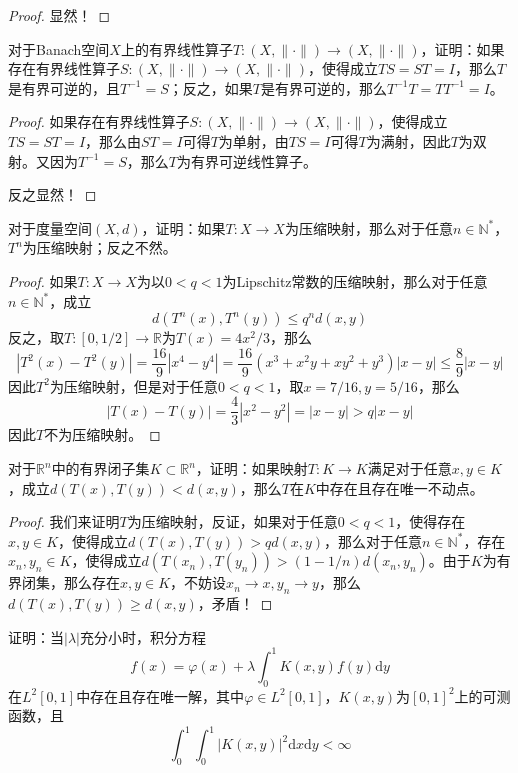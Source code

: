 \documentclass[lang = cn, scheme = chinese, 10pt]{elegantbook}
\newcommand{\N}{\mathbb{N}}  %
\newcommand{\R}{\mathbb{R}}  %
\newcommand{\sub}{\subset}   %
\begin{document}
\begin{proof}
	显然！
\end{proof}

\begin{proposition}
	对于Banach空间$X$上的有界线性算子$T:(X,\|\cdot\|)\to (X,\|\cdot\|)$，证明：如果存在有界线性算子$S:(X,\|\cdot\|)\to (X,\|\cdot\|)$，使得成立$TS=ST=I$，那么$T$是有界可逆的，且$T^{-1}=S$；反之，如果$T$是有界可逆的，那么$T^{-1}T=TT^{-1}=I$。
\end{proposition}

\begin{proof}
	如果存在有界线性算子$S:(X,\|\cdot\|)\to (X,\|\cdot\|)$，使得成立$TS=ST=I$，那么由$ST=I$可得$T$为单射，由$TS=I$可得$T$为满射，因此$T$为双射。又因为$T^{-1}=S$，那么$T$为有界可逆线性算子。
	
	反之显然！
\end{proof}

\begin{proposition}
	对于度量空间$(X,d)$，证明：如果$T:X\to X$为压缩映射，那么对于任意$n\in\N^*$，$T^n$为压缩映射；反之不然。
	
\end{proposition}

\begin{proof}
	如果$T:X\to X$为以$0<q<1$为Lipschitz常数的压缩映射，那么对于任意$n\in\N^*$，成立
	$$
	d(T^n(x),T^n(y))\le q^nd(x,y)
	$$
	反之，取$T:[0,1/2]\to\R$为$T(x)=4x^2/3$，那么
	$$
	|T^2(x)-T^2(y)|=\frac{16}{9}|x^4-y^4|=\frac{16}{9}(x^3+x^2y+xy^2+y^3)|x-y|\le \frac{8}{9}|x-y|
	$$
	因此$T^2$为压缩映射，但是对于任意$0<q<1$，取$x=7/16,y=5/16$，那么
	$$
	|T(x)-T(y)|=\frac{4}{3}|x^2-y^2|=|x-y|>q|x-y|
	$$
	因此$T$不为压缩映射。
\end{proof}

\begin{proposition}
	对于$\R^n$中的有界闭子集$K\sub \R^n$，证明：如果映射$T:K\to K$满足对于任意$x,y\in K$，成立$d(T(x),T(y))<d(x,y)$，那么$T$在$K$中存在且存在唯一不动点。
\end{proposition}

\begin{proof}
	我们来证明$T$为压缩映射，反证，如果对于任意$0<q<1$，使得存在$x,y\in K$，使得成立$d(T(x),T(y))>qd(x,y)$，那么对于任意$n\in\N^*$，存在$x_n,y_n\in K$，使得成立$d(T(x_n),T(y_n))>(1-1/n)d(x_n,y_n)$。由于$K$为有界闭集，那么存在$x,y\in K$，不妨设$x_n\to x,y_n\to y$，那么$d(T(x),T(y))\ge d(x,y)$，矛盾！
\end{proof}

\begin{proposition}
	证明：当$|\lambda|$充分小时，积分方程
	$$
	f(x)=\varphi(x)+\lambda \int_0^1K(x,y)f(y)\mathrm{d}y
	$$
	在$L^2[0,1]$中存在且存在唯一解，其中$\varphi\in L^2[0,1]$，$K(x,y)$为$[0,1]^2$上的可测函数，且
	$$
	\int_0^1\int_0^1|K(x,y)|^2\mathrm{d}x\mathrm{d}y<\infty
	$$
\end{proposition}
\end{document}
